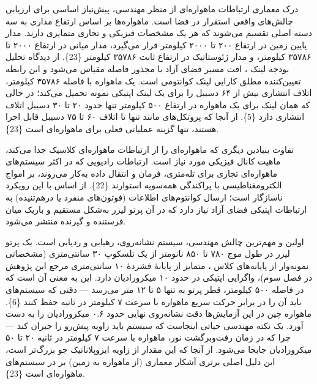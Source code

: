 \documentclass[a4paper,14pt]{extreport}
\begin{document}
درک معماری ارتباطات ماهواره‌ای از منظر مهندسی، پیش‌نیاز اساسی برای ارزیابی چالش‌های واقعی استقرار  در فضا است. ماهواره‌ها بر اساس ارتفاع مداری به سه دسته اصلی تقسیم می‌شوند که هر یک مشخصات فیزیکی و تجاری متمایزی دارند. مدار پایین زمین  در ارتفاع ۲۰۰ تا ۲۰۰۰ کیلومتر قرار می‌گیرد، مدار میانی  در ارتفاع ۲۰۰۰ تا ۳۵۷۸۶ کیلومتر، و مدار ژئوستاتیک  در ارتفاع ثابت ۳۵۷۸۶ کیلومتر \{23\}. از دیدگاه تحلیل بودجه لینک ، افت مسیر فضای آزاد با مجذور فاصله مقیاس می‌شود و این رابطه تعیین‌کننده مطلق کارایی لینک کوانتومی است. یک ماهواره  با فاصله ۳۵۷۸۶ کیلومتر، اتلاف انتشاری بیش از ۶۴ دسیبل را برای یک لینک اپتیکی نمونه تحمیل می‌کند؛ در حالی که همان لینک برای یک ماهواره  در ارتفاع ۵۰۰ کیلومتر تنها حدود ۲۰ تا ۳۰ دسیبل اتلاف انتشاری دارد \{5\}. از آنجا که پروتکل‌های  مانند  تنها تا اتلاف ۶۰ تا ۷۵ دسیبل قابل اجرا هستند،  تنها گزینه عملیاتی فعلی برای  ماهواره‌ای است \{23\}.

تفاوت بنیادین دیگری که  ماهواره‌ای را از ارتباطات ماهواره‌ای کلاسیک جدا می‌کند، ماهیت کانال فیزیکی مورد نیاز است. ارتباطات رادیویی  که در اکثر سیستم‌های ماهواره‌ای تجاری برای تله‌متری، فرمان و انتقال داده به‌کار می‌روند، بر امواج الکترومغناطیسی با پراکندگی همه‌سویه استوارند \{22\}.  از اساس با این رویکرد ناسازگار است؛ ارسال کوانتوم‌های اطلاعات (فوتون‌های منفرد یا درهم‌تنیده) به ارتباطات اپتیکی فضای آزاد  نیاز دارد که در آن پرتو لیزر به‌شکل مستقیم و باریک میان فرستنده و گیرنده منتشر می‌شود.

اولین و مهم‌ترین چالش مهندسی، سیستم نشانه‌روی، رهیابی و ردیابی  است. یک پرتو لیزر  در طول موج ۷۸۰ تا ۸۵۰ نانومتر از یک تلسکوپ ۳۰ سانتی‌متری (مشخصاتی نمونه‌وار از پایانه‌های کلاس ، متمایز از پایانهٔ فشردهٔ ۱۰ سانتی‌متری مرجع این پژوهش در فصل سوم)، واگرایی اپتیکی در حدود ۱۰ میکرورادیان دارد. این به معنی آن است که در فاصله ۵۰۰ کیلومتر، قطر پرتو به تنها ۵ تا ۱۲ متر می‌رسد --- دقتی که سیستم‌های  باید آن را در برابر حرکت سریع ماهواره با سرعت ۷ کیلومتر در ثانیه حفظ کنند \{6\}. ماهواره  چین در این آزمایش‌ها دقت نشانه‌روی نهایی حدود ۰.۶ میکرورادیان را به دست آورد. یک نکته مهندسی حیاتی اینجاست که سیستم  باید زاویه پیش‌رو  را جبران کند --- چرا که در زمان رفت‌وبرگشت نور، ماهواره  با سرعت ۷ کیلومتر در ثانیه ۲۰ تا ۵۰ میکرورادیان جابجا می‌شود. از آنجا که این مقدار از زاویه ایزوپلاناتیک جو  بزرگ‌تر است، این دلیل اصلی برتری آشکار معماری  (از ماهواره به زمین) بر  در سیستم‌های  ماهواره‌ای است \{23\}.
\end{document}
